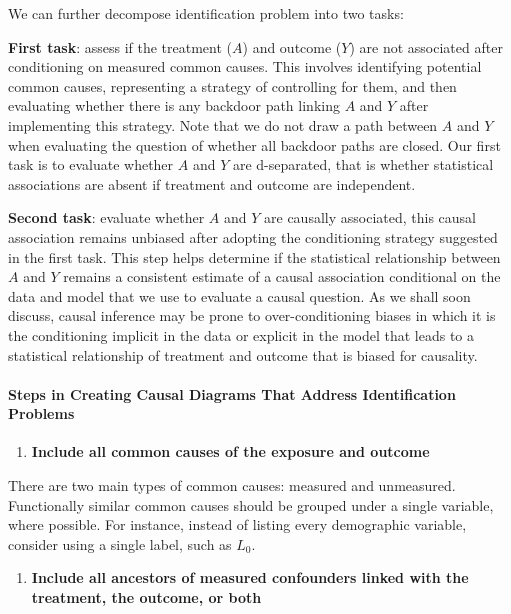 \documentclass[
  singlecolumn]{article}
\let\oldparagraph\paragraph
\renewcommand{\paragraph}[1]{\oldparagraph{#1}\mbox{}}
\providecommand{\tightlist}{%
  \setlength{\itemsep}{0pt}\setlength{\parskip}{0pt}}\usepackage{longtable,booktabs,array}
\begin{document}
We can further decompose identification problem into two tasks:

\textbf{First task}: assess if the treatment (\(A\)) and outcome (\(Y\))
are not associated after conditioning on measured common causes. This
involves identifying potential common causes, representing a strategy of
controlling for them, and then evaluating whether there is any backdoor
path linking \(A\) and \(Y\) after implementing this strategy. Note that
we do not draw a path between \(A\) and \(Y\) when evaluating the
question of whether all backdoor paths are closed. Our first task is to
evaluate whether \(A\) and \(Y\) are d-separated, that is whether
statistical associations are absent if treatment and outcome are
independent.

\textbf{Second task}: evaluate whether \(A\) and \(Y\) are causally
associated, this causal association remains unbiased after adopting the
conditioning strategy suggested in the first task. This step helps
determine if the statistical relationship between \(A\) and \(Y\)
remains a consistent estimate of a causal association conditional on the
data and model that we use to evaluate a causal question. As we shall
soon discuss, causal inference may be prone to over-conditioning biases
in which it is the conditioning implicit in the data or explicit in the
model that leads to a statistical relationship of treatment and outcome
that is biased for causality.

\paragraph{Steps in Creating Causal Diagrams That Address Identification
Problems}\label{steps-in-creating-causal-diagrams-that-address-identification-problems}

\begin{enumerate}
\def\labelenumi{\arabic{enumi}.}
\tightlist
\item
  \textbf{Include all common causes of the exposure and outcome}
\end{enumerate}

There are two main types of common causes: measured and unmeasured.
Functionally similar common causes should be grouped under a single
variable, where possible. For instance, instead of listing every
demographic variable, consider using a single label, such as \(L_0\).

\begin{enumerate}
\def\labelenumi{\arabic{enumi}.}
\setcounter{enumi}{1}
\tightlist
\item
  \textbf{Include all ancestors of measured confounders linked with the
  treatment, the outcome, or both}
\end{enumerate}
\end{document}

